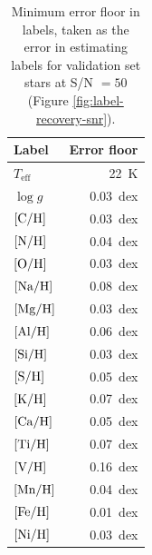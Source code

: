 \documentclass[12pt,preprint]{aastex}
\newcommand{\logg}{\log g}
\newcommand{\Teff}{T_{\mathrm{eff}}}
\begin{document}
\begin{table}
\centering
\begin{tabular}{lr}
\hline
Label & Error floor \\
\hline
$\Teff$ 		& 22~K \\
$\logg$ 		& 0.03~dex \\
$[\rm{C/H}]$ 	& 0.03~dex \\
$[\rm{N/H}]$  	& 0.04~dex \\
$[\rm{O/H}]$  	& 0.03~dex \\
$[\rm{Na/H}]$ 	& 0.08~dex \\
$[\rm{Mg/H}]$ 	& 0.03~dex \\
$[\rm{Al/H}]$ 	& 0.06~dex \\
$[\rm{Si/H}]$ 	& 0.03~dex \\
$[\rm{S/H}]$	& 0.05~dex \\
$[\rm{K/H}]$ 	& 0.07~dex \\
$[\rm{Ca/H}]$ 	& 0.05~dex \\
$[\rm{Ti/H}]$ 	& 0.07~dex \\
$[\rm{V/H}]$ 	& 0.16~dex \\
$[\rm{Mn/H}]$ 	& 0.04~dex \\
$[\rm{Fe/H}]$ 	& 0.01~dex \\
$[\rm{Ni/H}]$ 	& 0.03~dex \\
\hline
\end{tabular}
\caption{Minimum error floor in labels, taken as the error in estimating labels for validation set stars at S/N $= 50$ (Figure \ref{fig:label-recovery-snr}).\label{tab:error-floors}}
\label{tab:error-floors}
\end{table}


\clearpage
\end{document}
